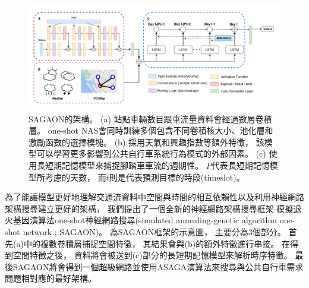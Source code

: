 \documentclass[a4paper,12pt]{extarticle}
\begin{document}
        \begin{figure}[h]
            \includegraphics[width=\textwidth]{SAGAON.png}
            \caption{
                SAGAON的架構。
                (a) 站點車輛數目跟車流量資料會經過數層卷積層。
                one-shot NAS會同時訓練多個包含不同卷積核大小、池化層和激勵函數的選擇模塊。
                (b) 採用天氣和興趣指數等額外特徵，
                該模型可以學習更多影響到公共自行車系統行為模式的外部因素。
                (c) 使用長短期記憶模型來捕捉腳踏車車流的週期性。
                $P$代表長短期記憶模型所考慮的天數，
                而$t$則是代表預測目標的時段(timeslot)。
            }
            \label{fig:SAGAON}
        \end{figure}

        為了能讓模型更好地理解交通流資料中空間與時間的相互依賴性以及利用神經網路架構搜尋建立更好的架構，
        我們提出了一個全新的神經網路架構搜尋框架-模擬退火基因演算法one-shot神經網路搜尋(simulated annealing-genetic algorithm one-shot network ; SAGAON)。
        為SAGAON框架的示意圖，
        主要分為3個部分。
        首先(a)中的複數卷積層捕捉空間特徵，
        其結果會與(b)的額外特徵進行串接。
        在得到空間特徵之後，
        資料將會被送到(c)部分的長短期記憶模型來解析時序特徵。
        最後SAGAON將會得到一個超級網路並使用ASAGA演算法來搜尋與公共自行車需求問題相對應的最好架構。
\end{document}
